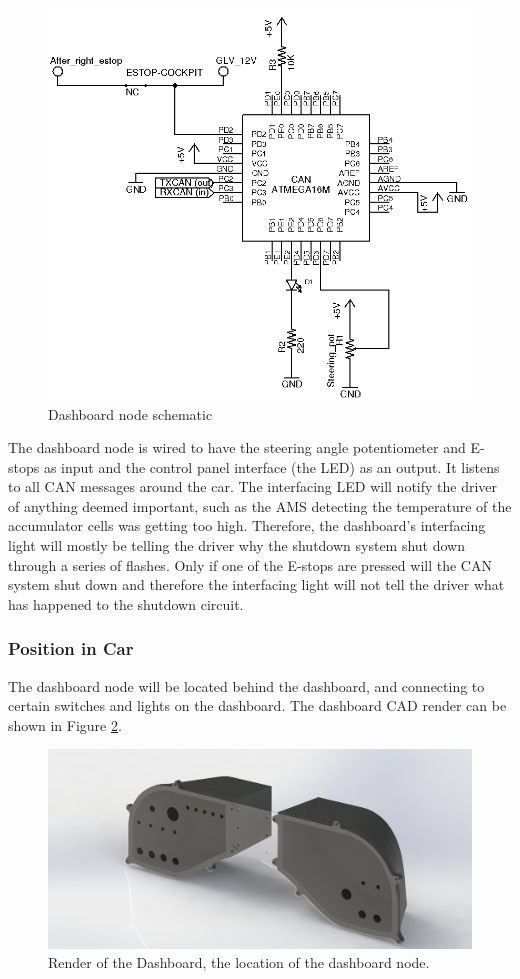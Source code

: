 \documentclass{article}
\begin{document}
            \begin{figure}[H]
                \centering
                \includegraphics[width = 0.8 \textwidth]{CANdashboard}
                \caption{Dashboard node schematic}
                \label{dashschem}
            \end{figure}
            
            The dashboard node is wired to have the steering angle potentiometer and E-stops as input and the control panel interface (the LED) as an output. It listens to all CAN messages around the car. The interfacing LED will notify the driver of anything deemed important, such as the AMS detecting the temperature of the accumulator cells was getting too high. Therefore, the dashboard's interfacing light will mostly be telling the driver why the shutdown system shut down through a series of flashes. Only if one of the E-stops are pressed will the CAN system shut down and therefore the interfacing light will not tell the driver what has happened to the shutdown circuit. 

        \subsubsection{Position in Car}

            The dashboard node will be located behind the dashboard, and connecting to certain switches and lights on the dashboard. The dashboard CAD render can be shown in Figure \ref{dashboard}.
            
            \begin{figure}[H]
            \centering
            \includegraphics[width = 0.7 \textwidth]{Dashboard}
            \caption{Render of the Dashboard, the location of the dashboard node. }
            \label{dashboard}
            \end{figure}
\end{document}
